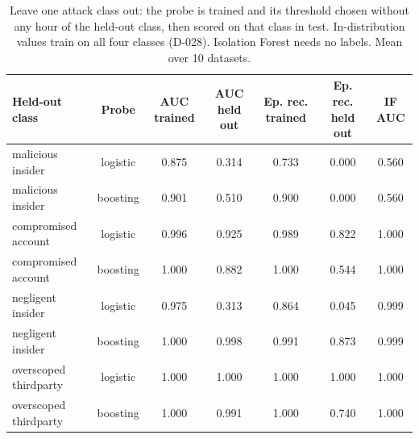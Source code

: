 \begin{table}[t]
\centering
\scriptsize
\caption{Leave one attack class out: the probe is trained and its threshold chosen without any hour of the held-out class, then scored on that class in test. In-distribution values train on all four classes (D-028). Isolation Forest needs no labels. Mean over 10 datasets.}
\label{tab:loco}
\begin{tabular}{lcccccc}
\hline
Held-out class & Probe & AUC trained & AUC held out & Ep. rec. trained & Ep. rec. held out & IF AUC \\
\hline
malicious insider & logistic & 0.875 & 0.314 & 0.733 & 0.000 & 0.560 \\
malicious insider & boosting & 0.901 & 0.510 & 0.900 & 0.000 & 0.560 \\
compromised account & logistic & 0.996 & 0.925 & 0.989 & 0.822 & 1.000 \\
compromised account & boosting & 1.000 & 0.882 & 1.000 & 0.544 & 1.000 \\
negligent insider & logistic & 0.975 & 0.313 & 0.864 & 0.045 & 0.999 \\
negligent insider & boosting & 1.000 & 0.998 & 0.991 & 0.873 & 0.999 \\
overscoped thirdparty & logistic & 1.000 & 1.000 & 1.000 & 1.000 & 1.000 \\
overscoped thirdparty & boosting & 1.000 & 0.991 & 1.000 & 0.740 & 1.000 \\
\hline
\end{tabular}
\end{table}
